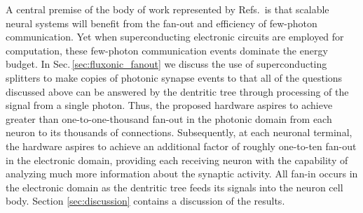 \documentclass[twocolumn]{article}
\begin{document}
A central premise of the body of work represented by Refs.\,\cite{shbu2017,sh2018,sh2018_full,sh2018_ICRC} is that scalable neural systems will benefit from the fan-out and efficiency of few-photon communication. Yet when superconducting electronic circuits are employed for computation, these few-photon communication events dominate the energy budget. In Sec.\,\ref{sec:fluxonic_fanout} we discuss the use of superconducting splitters to make copies of photonic synapse events to that all of the questions discussed above can be answered by the dentritic tree through processing of the signal from a single photon. Thus, the proposed hardware aspires to achieve greater than one-to-one-thousand fan-out in the photonic domain from each neuron to its thousands of connections. Subsequently, at each neuronal terminal, the hardware aspires to achieve an additional factor of roughly one-to-ten fan-out in the electronic domain, providing each receiving neuron with the capability of analyzing much more information about the synaptic activity. All fan-in occurs in the electronic domain as the dentritic tree feeds its signals into the neuron cell body. Section \ref{sec:discussion} contains a discussion of the results.
\end{document}
